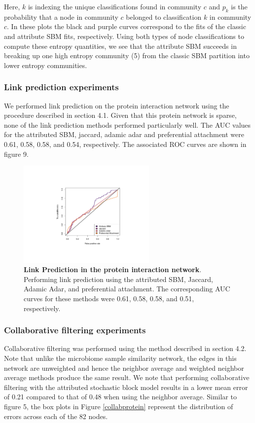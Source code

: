 Here, $k$ is indexing the unique classifications found in community $c$ and $p_{k}$ is the probability that a node in community $c$ belonged to classification $k$ in community $c$. In these plots the black and purple curves correspond to the fits of the classic and attribute SBM fits, respectively. Using both types of node classifications to compute these entropy quantities, we see that the attribute SBM succeeds in breaking up one high entropy community (5) from the classic SBM partition into lower entropy communities. 

\subsubsection{Link prediction experiments}
We performed link prediction on the protein interaction network using the procedure described in section 4.1. Given that this protein network is sparse, none of the link prediction methods performed particularly well. The AUC values for the attributed SBM, jaccard, adamic adar and preferential attachment were 0.61, 0.58, 0.58, and 0.54, respectively. The associated ROC curves are shown in figure 9.  

\begin{figure}[h!]
\begin{center}
\includegraphics[width=0.6\textwidth]{ROC_Protein.pdf}
\caption{{\bf Link Prediction in the protein interaction network}. Performing link prediction using the attributed SBM, Jaccard, Adamic Adar, and preferential attachment. The corresponding AUC curves for these methods were 0.61, 0.58, 0.58, and 0.51, respectively.}
\end{center}
\end{figure}

\subsubsection{Collaborative filtering experiments}
Collaborative filtering was performed using the method described in section 4.2. Note that unlike the microbiome sample similarity network, the edges in this network are unweighted and hence the neighbor average and weighted neighbor average methods produce the same result. We note that performing collaborative filtering with the attributed stochastic block model results in a lower mean error of 0.21 compared to that of 0.48 when using the neighbor average. Similar to figure 5, the box plots in Figure \ref{collabprotein} represent the distribution of errors across each of the 82 nodes.

